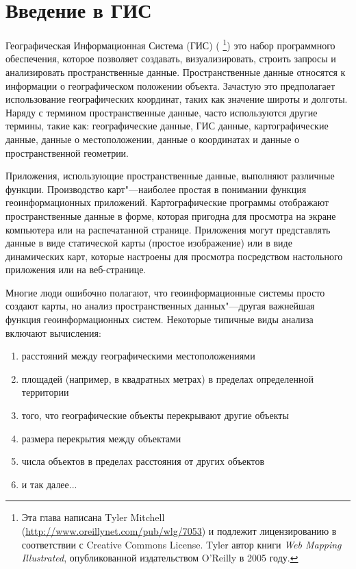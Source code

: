 \pagestyle{scrheadings}
\chapter{Введение в ГИС}\label{label_intro}


Географическая Информационная Система (ГИС) (\cite{mitchel05}
\footnote{Эта глава написана Tyler Mitchell
(\url{http://www.oreillynet.com/pub/wlg/7053}) и подлежит лицензированию
в соответствии с Creative Commons License. Tyler автор книги
\textit{Web Mapping Illustrated}, опубликованной издательством O'Reilly
в 2005 году.}) это набор программного обеспечения, которое позволяет
создавать, визуализировать, строить запросы и анализировать
пространственные данные. Пространственные данные относятся к информации
о географическом положении объекта. Зачастую это предполагает
использование географических координат, таких как значение широты и
долготы. Наряду с термином пространственные данные, часто используются
другие термины, такие как: географические данные, ГИС данные,
картографические данные, данные о местоположении, данные о координатах
и данные о пространственной геометрии.

Приложения, использующие пространственные данные, выполняют различные
функции. Производство карт"---наиболее простая в понимании функция
геоинформационных приложений. Картографические программы отображают
пространственные данные в форме, которая пригодна для просмотра на
экране компьютера или на распечатанной странице. Приложения могут
представлять данные в виде статической карты (простое изображение) или
в виде динамических карт, которые настроены для просмотра посредством
настольного приложения или на веб-странице.

Многие люди ошибочно полагают, что геоинформационные системы просто
создают карты, но анализ пространственных данных"---другая важнейшая
функция геоинформационных систем. Некоторые типичные виды анализа
включают вычисления:

\begin{enumerate}
\item расстояний между географическими местоположениями
\item площадей (например, в квадратных метрах) в пределах определенной
территории
\item того, что географические объекты перекрывают другие объекты
\item размера перекрытия между объектами
\item числа объектов в пределах расстояния от других объектов
\item и так далее...
\end{enumerate}

